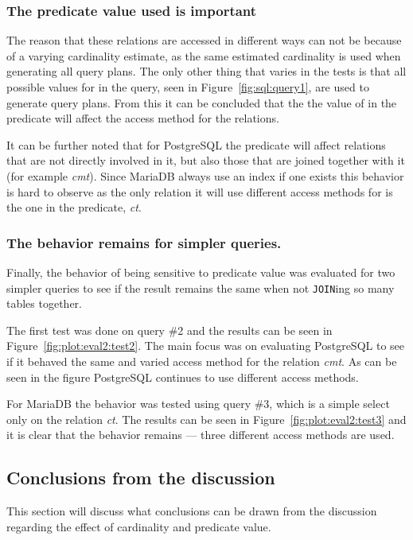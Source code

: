\subsubsection{The predicate value used is important}
The reason that these relations are accessed in different ways can not be
because of a varying cardinality estimate, as the same estimated cardinality is
used when generating all query plans. The only other thing that varies in the
tests is that all possible values for  in the query, seen in
Figure~\ref{fig:sql:query1}, are used to generate query plans. From this it can
be concluded that the the value of  in the predicate  will affect the access method for the relations.

It can be further noted that for PostgreSQL the predicate will affect relations
that are not directly involved in it, but also those that are joined together
with it (for example \textit{cmt}). Since MariaDB always use an index if one
exists this behavior is hard to observe as the only relation it will use
different access methods for is the one in the predicate, \textit{ct}.

\subsubsection{The behavior remains for simpler queries.}
Finally, the behavior of being sensitive to predicate value was evaluated for
two simpler queries to see if the result remains the same when not
\texttt{JOIN}ing so many tables together.

The first test was done on query \#2 and the results can be seen in
Figure~\ref{fig:plot:eval2:test2}. The main focus was on evaluating PostgreSQL
to see if it behaved the same and varied access method for the relation
\textit{cmt}. As can be seen in the figure PostgreSQL continues to use different
access methods.

For MariaDB the behavior was tested using query \#3, which is a simple select
only on the relation \textit{ct}. The results can be seen in
Figure~\ref{fig:plot:eval2:test3} and it is clear that the behavior remains ---
three different access methods are used.

\subsection{Conclusions from the discussion}
This section will discuss what conclusions can be drawn from the discussion
regarding the effect of cardinality and predicate value.

